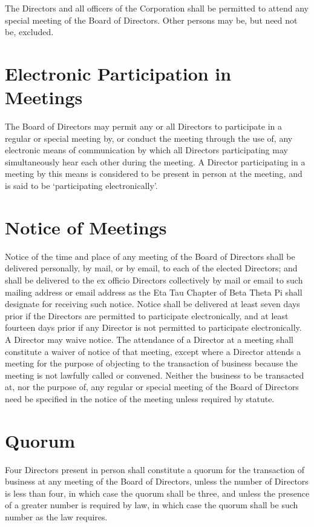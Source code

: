 The Directors and all officers of the Corporation shall be permitted to attend
any special meeting of the Board of Directors.  Other persons may be, but need
not be, excluded.

\section{Electronic Participation in Meetings}

The Board of Directors may permit any or all Directors to participate in a
regular or special meeting by, or conduct the meeting through the use of, any
electronic means of communication by which all Directors participating may
simultaneously hear each other during the meeting. A Director participating in a
meeting by this means is considered to be present in person at the meeting, and
is said to be `participating electronically'.


\section{Notice of Meetings}

Notice of the time and place of any meeting of the Board of Directors shall be
delivered personally, by mail, or by email, to each of the elected Directors;
and shall be delivered to the ex officio Directors collectively by mail or email
to such mailing address or email address as the Eta Tau Chapter of Beta Theta Pi
shall designate for receiving such notice. Notice shall be delivered at least
seven days prior if the Directors are permitted to participate electronically,
and at least fourteen days prior if any Director is not permitted to participate
electronically. A Director may waive notice. The attendance of a Director at a
meeting shall constitute a waiver of notice of that meeting, except where a
Director attends a meeting for the purpose of objecting to the transaction of
business because the meeting is not lawfully called or convened. Neither the
business to be transacted at, nor the purpose of, any regular or special meeting
of the Board of Directors need be specified in the notice of the meeting unless
required by statute.

\section{Quorum}

Four Directors present in person shall constitute a quorum for the transaction
of business at any meeting of the Board of Directors, unless the number of
Directors is less than four, in which case the quorum shall be three, and unless
the presence of a greater number is required by law, in which case the quorum
shall be such number as the law requires.

